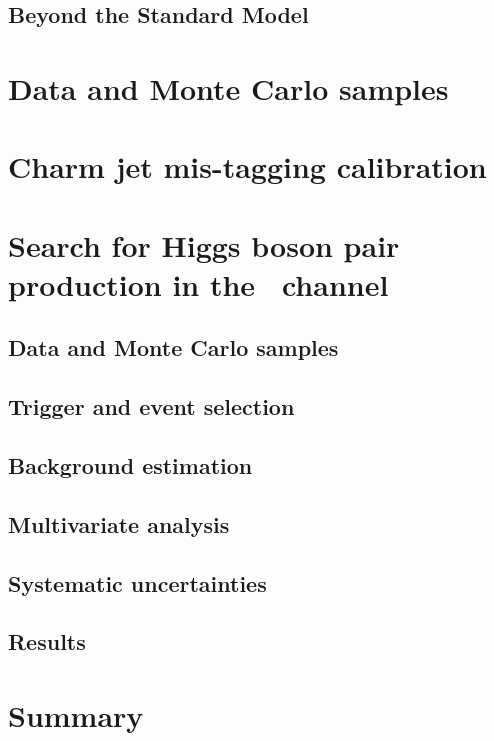 \documentclass[twoside,11pt]{report}
\begin{document}
\section{Beyond the Standard Model}
\large

\chapter{Data and Monte Carlo samples}
\large



 
\chapter{Charm jet mis-tagging calibration}





\large
\chapter{Search for Higgs boson pair production in the \bbtt\ channel}
\label{sec:search for dihiggs}
\section{Data and Monte Carlo samples}
\section{Trigger and event selection}
\label{sec:event selection}
\section{Background estimation}
\section{Multivariate analysis}
\section{Systematic uncertainties}
\section{Results}
\chapter{Summary}

\printbibliography
\appendix

\end{document}
